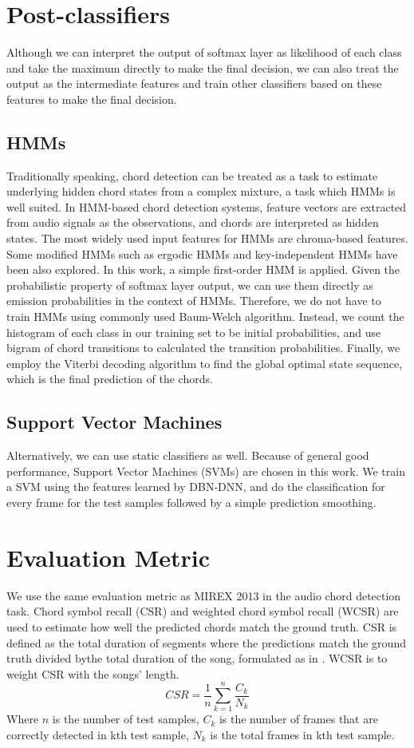 \documentclass{article}
\begin{document}
\section{Post-classifiers}\label{sec:class}
Although we can interpret the output of softmax layer as likelihood of each class and take the maximum directly to make the final decision, we can also treat the output as the intermediate features and train other classifiers based on these features to make the final decision. 
\subsection{HMMs}
Traditionally speaking, chord detection can be treated as a task to estimate underlying hidden chord states from a complex mixture, a task which HMMs is well suited. In HMM-based chord detection systems, feature vectors are extracted from audio signals as the observations, and chords are interpreted as hidden states. The most widely used input features for HMMs are chroma-based features. Some modified HMMs such as ergodic HMMs and key-independent HMMs have been also explored. In this work, a simple first-order HMM is applied. Given the probabilistic property of softmax layer output, we can use them directly as emission probabilities in the context of HMMs. Therefore, we do not have to train HMMs using commonly used Baum-Welch algorithm. Instead, we count the histogram of each class in our training set to be initial probabilities, and use bigram of chord transitions to calculated the transition probabilities. Finally, we employ the Viterbi decoding algorithm to find the global optimal state sequence, which is the final prediction of the chords. 
\subsection{Support Vector Machines}
Alternatively, we can use static classifiers as well. Because of general good performance, Support Vector Machines (SVMs) are chosen in this work. We train a SVM using the features learned by DBN-DNN, and do the classification for every frame for the test samples followed by a simple prediction smoothing. 

\section{Evaluation Metric}
We use the same evaluation metric as MIREX 2013 in the audio chord detection task. Chord symbol recall (CSR) and weighted chord symbol recall (WCSR) are used to estimate how well the predicted chords match the ground truth. CSR is defined as the total duration of segments where the predictions match the ground truth divided bythe total duration of the song, formulated as in . WCSR is to weight CSR with the songs' length.  
\begin{equation}\label{csr}
CSR = \frac{1}{n} \sum_{k=1}^n \frac{C_{k}}{N_{k}}
\end{equation}
Where $n$ is the number of test samples, $C_{k}$ is the number of frames that are correctly detected in kth test sample, $N_{k}$ is the total frames in kth test sample. 
\end{document}

